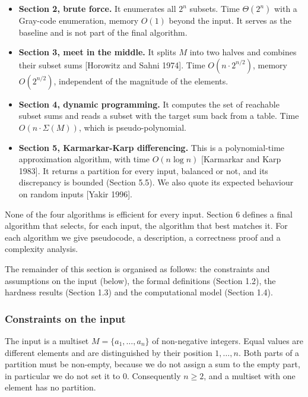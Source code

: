 \documentclass[
]{article}
\providecommand{\tightlist}{%
  \setlength{\itemsep}{0pt}\setlength{\parskip}{0pt}}
\begin{document}
\begin{itemize}
\tightlist
\item
  \textbf{Section 2, brute force.} It enumerates all \(2^n\) subsets.
  Time \(\Theta(2^n)\) with a Gray-code enumeration, memory \(O(1)\)
  beyond the input. It serves as the baseline and is not part of the
  final algorithm.
\item
  \textbf{Section 3, meet in the middle.} It splits \(M\) into two
  halves and combines their subset sums {[}Horowitz and Sahni 1974{]}.
  Time \(O(n \cdot 2^{n/2})\), memory \(O(2^{n/2})\), independent of the
  magnitude of the elements.
\item
  \textbf{Section 4, dynamic programming.} It computes the set of
  reachable subset sums and reads a subset with the target sum back from
  a table. Time \(O(n \cdot \Sigma(M))\), which is pseudo-polynomial.
\item
  \textbf{Section 5, Karmarkar-Karp differencing.} This is a
  polynomial-time approximation algorithm, with time \(O(n \log n)\)
  {[}Karmarkar and Karp 1983{]}. It returns a partition for every input,
  balanced or not, and its discrepancy is bounded (Section 5.5). We also
  quote its expected behaviour on random inputs {[}Yakir 1996{]}.
\end{itemize}

None of the four algorithms is efficient for every input. Section 6
defines a final algorithm that selects, for each input, the algorithm
that best matches it. For each algorithm we give pseudocode, a
description, a correctness proof and a complexity analysis.

The remainder of this section is organised as follows: the constraints
and assumptions on the input (below), the formal definitions (Section
1.2), the hardness results (Section 1.3) and the computational model
(Section 1.4).

\hypertarget{constraints-on-the-input}{%
\subsubsection{Constraints on the
input}\label{constraints-on-the-input}}

The input is a multiset \(M = \{a_1, \dots, a_n\}\) of non-negative
integers. Equal values are different elements and are distinguished by
their position \(1, \dots, n\). Both parts of a partition must be
non-empty, because we do not assign a sum to the empty part, in
particular we do not set it to \(0\). Consequently \(n \ge 2\), and a
multiset with one element has no partition.
\end{document}
